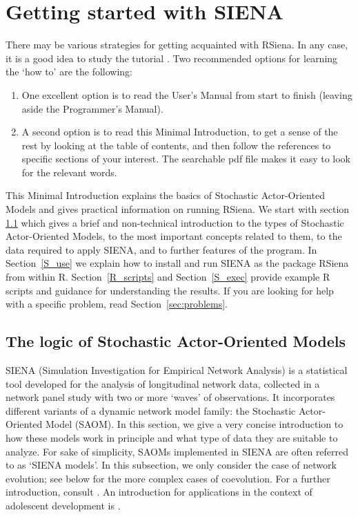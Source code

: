 \documentclass[a4paper,fleqn,11pt]{article}
\newcommand{\+}{\, + \,}
\newcommand{\R}{{\sf R }}
\newcommand{\Rn}{{\sf R}}
\newcommand{\rs}{{\sf RSiena}}
\newcommand{\RS}{{\sf RSiena }}
\newcommand{\SI}{{\sf SIENA }}
\newcommand{\si}{{\sf SIENA}}
\newcommand{\SAOM}{{Stochastic Actor-Oriented Model }}
\newcommand{\saom}{{Stochastic Actor-Oriented Model}}
\begin{document}
\section{Getting started with \SI}
\label{S_minsi1}

There may be various strategies for getting acquainted with \rs.
In any case, it is a good idea to study the tutorial  \citet{SnijdersEA10b}.
Two recommended options for learning the `how to' are the following:
\begin{enumerate}
\item One excellent option is to read the User's Manual
from start to finish (leaving aside the Programmer's Manual).
\item A second option is to read this Minimal Introduction, to get a sense
 of the rest by looking at the table of contents, and then follow
			the references to specific sections of your interest.
  The searchable pdf file makes it easy to look for the relevant words.
\end{enumerate}

\noindent
This Minimal Introduction explains the basics of {\saom}s
and gives practical information on running \rs.
We start with section \ref{S_logic} which gives a brief and non-technical
introduction to the types of {\saom}s, to the most important concepts related
to them, to the data required to apply \si, and to further features of the program.
In Section~\ref{S_use} we explain how to install and run \SI
as the package \RS from within \Rn. Section~\ref{R_scripts} and
Section~\ref{S_exec} provide example \R scripts and guidance for
understanding the results.
If you are looking for help with a specific problem, read
Section~\ref{sec:problems}.


\subsection{The logic of {\saom}s}
\label{S_logic}

\SI (Simulation Investigation for Empirical Network Analysis) is a
statistical tool developed for the analysis of longitudinal network data,
collected in a network panel study with two or more `waves' of observations.
It incorporates different variants of a dynamic network model family:
the \SAOM (SAOM). In this section, we give
a very concise introduction to how these models work in principle and what
type of data they are suitable to analyze. For sake of simplicity,
SAOMs implemented in \SI are often referred to as `\SI models'.
In this subsection, we only consider the case of network evolution;
see below for the more complex cases of coevolution.
For a further introduction, consult  \citet{SnijdersEA10b}.
An introduction for applications in the context of adolescent
development is \citet{VeenstraEtAl2013}.
\end{document}
